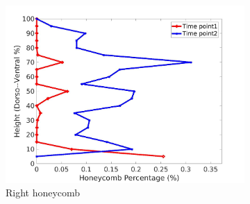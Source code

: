 \begin{figure}[H]
\begin{subfigure}{.42\linewidth}
  \includegraphics[width=\linewidth,trim={{.0\wd0} {.0\wd0} {.0\wd0} {.0\wd0}},clip]{Appendix/Image_AppexA/DorsoToVentral/IPF13RightLungHoneycombDiseaseDorsoToVentral.jpg}
  \caption{Right honeycomb}
  \label{fig:IPF13DiseaseDorsoToVentral-f}
\end{subfigure}
\begin{subfigure}{.42\linewidth}%

\end{subfigure}
\end{figure}
